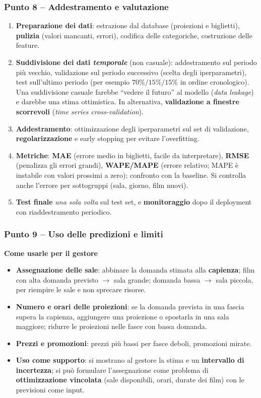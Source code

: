 \subsubsection*{Punto 8 -- Addestramento e valutazione}
\begin{enumerate}
    \item \textbf{Preparazione dei dati}: estrazione dal database (proiezioni e biglietti), \textbf{pulizia} (valori mancanti, errori), codifica delle categoriche, costruzione delle feature.
    \item \textbf{Suddivisione dei dati \emph{temporale}} (non casuale): addestramento sul periodo più vecchio, validazione sul periodo successivo (scelta degli iperparametri), test sull'ultimo periodo (per esempio $70\%/15\%/15\%$ in ordine cronologico). Una suddivisione casuale farebbe ``vedere il futuro'' al modello (\emph{data leakage}) e darebbe una stima ottimistica. In alternativa, \textbf{validazione a finestre scorrevoli} (\emph{time series cross-validation}).
    \item \textbf{Addestramento}: ottimizzazione degli iperparametri sul set di validazione, \textbf{regolarizzazione} e early stopping per evitare l'overfitting.
    \item \textbf{Metriche}: \textbf{MAE} (errore medio in biglietti, facile da interpretare), \textbf{RMSE} (penalizza gli errori grandi), \textbf{WAPE/MAPE} (errore relativo; MAPE è instabile con valori prossimi a zero); confronto con la baseline. Si controlla anche l'errore per sottogruppi (sala, giorno, film nuovi).
    \item \textbf{Test finale} \emph{una sola volta} sul test set, e \textbf{monitoraggio} dopo il deployment con riaddestramento periodico.
\end{enumerate}

\subsubsection*{Punto 9 -- Uso delle predizioni e limiti}
\textbf{Come usarle per il gestore}
\begin{itemize}
    \item \textbf{Assegnazione delle sale}: abbinare la domanda stimata alla \textbf{capienza}; film con alta domanda previsto $\to$ sala grande; domanda bassa $\to$ sala piccola, per riempire le sale e non sprecare risorse.
    \item \textbf{Numero e orari delle proiezioni}: se la domanda prevista in una fascia supera la capienza, aggiungere una proiezione o spostarla in una sala maggiore; ridurre le proiezioni nelle fasce con bassa domanda.
    \item \textbf{Prezzi e promozioni}: prezzi più bassi per fasce deboli, promozioni mirate.
    \item \textbf{Uso come supporto}: si mostrano al gestore la stima e un \textbf{intervallo di incertezza}; si può formulare l'assegnazione come problema di \textbf{ottimizzazione vincolata} (sale disponibili, orari, durate dei film) con le previsioni come input.
\end{itemize}

